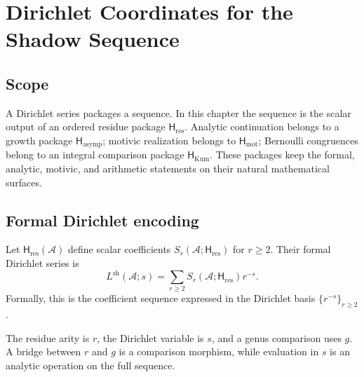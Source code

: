 
\providecommand{\cA}{\mathcal A}
\providecommand{\Vir}{\mathrm{Vir}}
\providecommand{\Lsh}{L^{\mathrm{sh}}}
\providecommand{\ClaimStatusProvedHere}{}
\providecommand{\ClaimStatusConditional}{}
\providecommand{\ClaimStatusDefinitional}{}
\providecommand{\ClaimStatusOpen}{}

\chapter{Dirichlet Coordinates for the Shadow Sequence}
\label{ch:shadow-L-function-platonic}

\section*{Scope}

A Dirichlet series packages a sequence.  In this chapter the sequence
is the scalar output of an ordered residue package
\(\mathsf H_{\mathrm{res}}\).  Analytic continuation belongs to a
growth package \(\mathsf H_{\mathrm{asymp}}\); motivic realization
belongs to \(\mathsf H_{\mathrm{mot}}\); Bernoulli congruences belong
to an integral comparison package \(\mathsf H_{\mathrm{Kum}}\).
These packages keep the formal, analytic, motivic, and arithmetic
statements on their natural mathematical surfaces.

\section{Formal Dirichlet encoding}
\label{sec:shL-setup}

\begin{definition}
\label{def:shadow-L-series}
\ClaimStatusDefinitional
Let \(\mathsf H_{\mathrm{res}}(\cA)\) define scalar coefficients
\(S_r(\cA;\mathsf H_{\mathrm{res}})\) for \(r\ge2\).  Their formal
Dirichlet series is
\[
 \Lsh(\cA;s)=\sum_{r\ge2}
 S_r(\cA;\mathsf H_{\mathrm{res}})r^{-s}.
\]
Formally, this is the coefficient sequence expressed in the Dirichlet
basis \(\{r^{-s}\}_{r\ge2}\).
\end{definition}

\begin{remark}
\label{rem:shL-two-reindexings}
The residue arity is \(r\), the Dirichlet variable is \(s\), and a
genus comparison uses \(g\).  A bridge between \(r\) and \(g\) is a
comparison morphism, while evaluation in \(s\) is an analytic
operation on the full sequence.
\end{remark}

